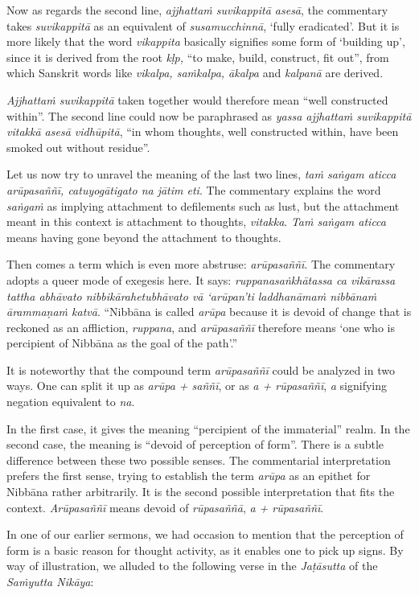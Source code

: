 Now as regards the second line, \emph{ajjhattaṁ suvikappitā asesā}, the commentary takes \emph{suvikappitā} as an equivalent of \emph{susamucchinnā}, `fully eradicated'. But it is more likely that the word \emph{vikappita} basically signifies some form of `building up', since it is derived from the root \emph{kḷp,} ``to make, build, construct, fit out'', from which Sanskrit words like \emph{vikalpa, saṁkalpa, ākalpa} and \emph{kalpanā} are derived.

\emph{Ajjhattaṁ suvikappitā} taken together would therefore mean ``well constructed within''. The second line could now be paraphrased as \emph{yassa ajjhattaṁ suvikappitā vitakkā asesā vidhūpitā}, ``in whom thoughts, well constructed within, have been smoked out without residue''.

Let us now try to unravel the meaning of the last two lines, \emph{taṁ saṅgam aticca arūpasaññī, catuyogātigato na jātim eti}. The commentary explains the word \emph{saṅgaṁ} as implying attachment to defilements such as lust, but the attachment meant in this context is attachment to thoughts, \emph{vitakka}. \emph{Taṁ saṅgam aticca} means having gone beyond the attachment to thoughts.

Then comes a term which is even more abstruse: \emph{arūpasaññī}. The commentary adopts a queer mode of exegesis here. It says: \emph{ruppanasaṅkhātassa ca vikārassa tattha abhāvato nibbikārahetubhāvato vā `arūpan'ti laddhanāmaṁ nibbānaṁ ārammaṇaṁ katvā}. ``Nibbāna is called \emph{arūpa} because it is devoid of change that is reckoned as an affliction, \emph{ruppana}, and \emph{arūpasaññī} therefore means `one who is percipient of Nibbāna as the goal of the path'.''

It is noteworthy that the compound term \emph{arūpasaññī} could be analyzed in two ways. One can split it up as \emph{arūpa + saññī}, or as \emph{a + rūpasaññī}, \emph{a} signifying negation equivalent to \emph{na}.

In the first case, it gives the meaning ``percipient of the immaterial'' realm. In the second case, the meaning is ``devoid of perception of form''. There is a subtle difference between these two possible senses. The commentarial interpretation prefers the first sense, trying to establish the term \emph{arūpa} as an epithet for Nibbāna rather arbitrarily. It is the second possible interpretation that fits the context. \emph{Arūpasaññī} means devoid of \emph{rūpasaññā}, \emph{a + rūpasaññī}.

In one of our earlier sermons, we had occasion to mention that the perception of form is a basic reason for thought activity, as it enables one to pick up signs. By way of illustration, we alluded to the following verse in the \emph{Jaṭāsutta} of the \emph{Saṁyutta Nikāya}:

